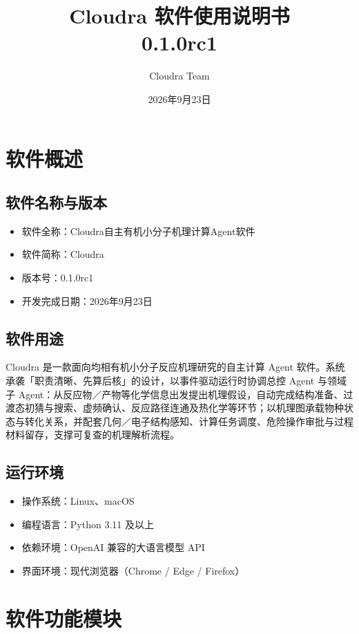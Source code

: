 \documentclass[zihao=-4,a4paper,fontset=none]{ctexart}
\title{\bfseries Cloudra 软件使用说明书\\[6pt] \large 0.1.0rc1}
\author{Cloudra Team}
\date{2026年9月23日}
\begin{document}
\maketitle
\thispagestyle{empty}

\tableofcontents

\section{软件概述}

\subsection{软件名称与版本}
\begin{itemize}[leftmargin=4em,itemsep=2pt]
  \item 软件全称：Cloudra自主有机小分子机理计算Agent软件
  \item 软件简称：Cloudra
  \item 版本号：0.1.0rc1
  \item 开发完成日期：2026年9月23日
\end{itemize}

\subsection{软件用途}
Cloudra 是一款面向均相有机小分子反应机理研究的自主计算 Agent 软件。系统承袭「职责清晰、先算后核」的设计，以事件驱动运行时协调总控 Agent 与领域子 Agent：从反应物／产物等化学信息出发提出机理假设，自动完成结构准备、过渡态初猜与搜索、虚频确认、反应路径连通及热化学等环节；以机理图承载物种状态与转化关系，并配套几何／电子结构感知、计算任务调度、危险操作审批与过程材料留存，支撑可复查的机理解析流程。
\subsection{运行环境}
\begin{itemize}[leftmargin=4em,itemsep=2pt]
  \item 操作系统：Linux、macOS
  \item 编程语言：Python 3.11 及以上
  \item 依赖环境：OpenAI 兼容的大语言模型 API
  \item 界面环境：现代浏览器（Chrome / Edge / Firefox）
\end{itemize}

\section{软件功能模块}
\end{document}
